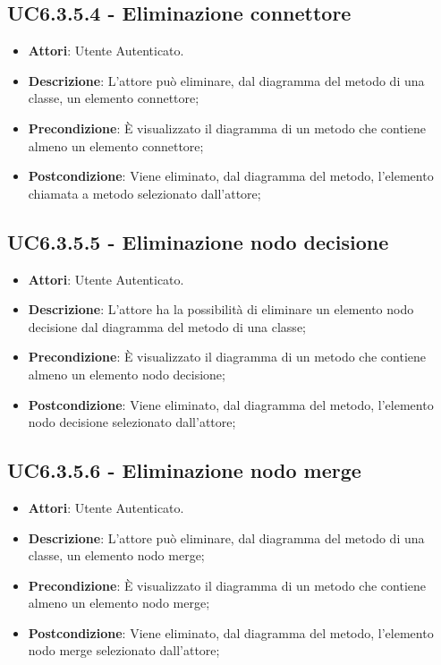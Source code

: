 \subsection{UC6.3.5.4 - Eliminazione connettore} 
\label{ssec:UC6.3.5.4} 
\begin{itemize} 
\item \textbf{Attori}: Utente Autenticato.
\item \textbf{Descrizione}: L'attore può eliminare, dal diagramma del metodo di una classe, un elemento connettore;
\item \textbf{Precondizione}: È visualizzato il diagramma di un metodo che contiene almeno un elemento connettore;
\item \textbf{Postcondizione}: Viene eliminato, dal diagramma del metodo,  l'elemento chiamata a metodo selezionato dall'attore;
\end{itemize} 
\subsection{UC6.3.5.5 - Eliminazione nodo decisione} 
\label{ssec:UC6.3.5.5} 
\begin{itemize} 
\item \textbf{Attori}: Utente Autenticato.
\item \textbf{Descrizione}: L'attore ha la possibilità di eliminare un elemento nodo decisione dal diagramma del metodo di una classe;
\item \textbf{Precondizione}: È visualizzato il diagramma di un metodo che contiene almeno un elemento nodo decisione;
\item \textbf{Postcondizione}: Viene eliminato, dal diagramma del metodo,  l'elemento nodo decisione selezionato dall'attore;
\end{itemize} 
\subsection{UC6.3.5.6 - Eliminazione nodo merge} 
\label{ssec:UC6.3.5.6} 
\begin{itemize} 
\item \textbf{Attori}: Utente Autenticato.
\item \textbf{Descrizione}: L'attore può eliminare, dal diagramma del metodo di una classe, un elemento nodo merge;
\item \textbf{Precondizione}: È visualizzato il diagramma di un metodo che contiene almeno un elemento nodo merge;
\item \textbf{Postcondizione}: Viene eliminato, dal diagramma del metodo,  l'elemento nodo merge selezionato dall'attore;
\end{itemize} 
